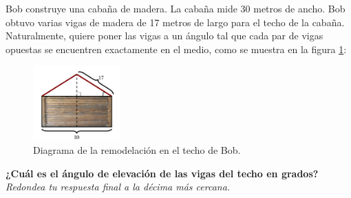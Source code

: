 \question[25] Bob construye una cabaña de madera. La cabaña mide 30 metros de ancho. Bob obtuvo
varias vigas de madera de 17 metros de largo para el techo de la cabaña.
Naturalmente, quiere poner las vigas a un ángulo tal que cada par de vigas opuestas se
encuentren exactamente en el medio, como se muestra en la figura \ref{fig:techo1}:
\begin{figure}[H]
    \begin{center}
        \includegraphics[width=0.3\textwidth]{../images/techo1.png}
    \end{center}
    \caption{Diagrama de la remodelación en el techo de Bob.}
    \label{fig:techo1}
\end{figure}
\textbf{¿Cuál es el ángulo de elevación de las vigas del techo en grados?}\\
\textit{Redondea tu respuesta final a la décima más cercana.}